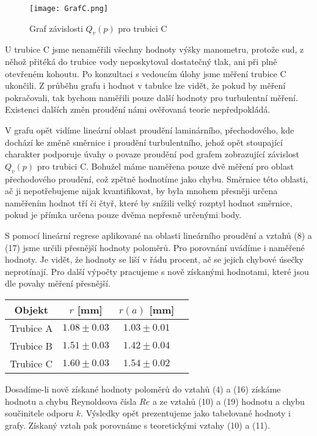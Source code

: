 \documentclass[a4paper]{article}
\begin{document}
\begin{figure}[H]
\centering
\texttt{[image: GrafC.png]}
\caption{Graf závislosti $Q_{v}(p)$ pro trubici C}
\end{figure}
\par U trubice C jsme nenaměřili všechny hodnoty výšky manometru, protože sud, z něhož přitéká do trubice vody neposkytoval dostatečný tlak, ani při plně otevřeném kohoutu. Po konzultaci s vedoucím úlohy jsme měření trubice C ukončili. Z průběhu grafu i hodnot v tabulce lze vidět, že pokud by měření pokračovali, tak bychom naměřili pouze další hodnoty pro turbulentní měření. Existenci dalších změn proudění námi ověřovaná teorie nepředpokládá.
\par V grafu opět vidíme lineární oblast proudění laminárního, přechodového, kde dochází ke změně směrnice i proudění turbulentního, jehož opět stoupající charakter podporuje úvahy o povaze proudění pod grafem zobrazující závislost $Q_{v}(p)$ pro trubici C. Bohužel máme naměřena pouze dvě měření pro oblast přechodového proudění, což zpětně hodnotíme jako chybu. Směrnice této oblasti, ač ji nepotřebujeme nijak kvantifikovat, by byla mnohem přesněji určena naměřením hodnot tří či čtyř, které by snížili velký rozptyl hodnot směrnice, pokud je přímka určena pouze dvěma nepřesně určenými body.
\par S pomocí lineární regrese aplikované na oblasti lineárního proudění a vztahů (8) a (17) jsme určili přesnější hodnoty poloměrů. Pro porovnání uvádíme i naměřené hodnoty. Je vidět, že hodnoty se liší v řádu procent, ač se jejich chybové úsečky neprotínají. Pro další výpočty pracujeme s nově získanými hodnotami, které jsou dle povahy měření přesnější.
\begin{center}
    \label{tab:title}
    \begin{tabular}{ | c | c | c |  p{3cm} |} \hline
    Objekt & $r$ [mm] & $r(a)$ [mm]   \\ \hline
    Trubice A & $1.08\pm0.03$ & $1.03\pm0.01$ \\ \hline
    Trubice B & $1.51\pm0.03$ & $1.42\pm0.04$ \\ \hline
    Trubice C & $1.60\pm0.03$ & $1.54\pm0.02$ \\ \hline
    \end{tabular}
\end{center}
\par Dosadíme-li nově získané hodnoty poloměrů do vztahů (4) a (16) získáme hodnotu a chybu Reynoldsova čísla $Re$ a ze vztahů (10) a (19) hodnotu a chybu součinitele odporu $k$. Výsledky opět prezentujeme jako tabelované hodnoty i grafy. Získaný vztah pak porovnáme s teoretickými vztahy (10) a (11).
\end{document}
